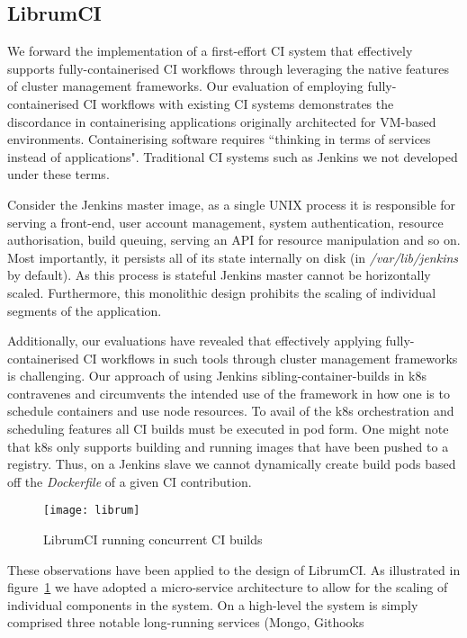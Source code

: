 \documentclass{report}
\begin{document}
\subsection{LibrumCI}
We forward the implementation of a first-effort CI system that
effectively supports fully-containerised CI workflows
through leveraging the native features of cluster 
management frameworks. Our evaluation of employing
fully-containerised CI workflows with existing CI systems
demonstrates the discordance in containerising applications originally architected for 
VM-based environments. Containerising software
requires ``thinking in terms of services instead
of applications". Traditional CI systems such as Jenkins
we not developed under these terms.
\par 
Consider the Jenkins master image, as a single UNIX process
it is responsible for serving a front-end, user account management,
system authentication, resource authorisation, build queuing, 
serving an API for resource manipulation
and so on. Most importantly, it persists all of its state internally on disk (in \textit{/var/lib/jenkins} by default).
As this process is stateful Jenkins master cannot be horizontally scaled. Furthermore,
this monolithic design prohibits the scaling of individual segments of the application. 
\par
Additionally, our evaluations have revealed that effectively
applying fully-containerised CI workflows in such tools through 
cluster management frameworks is challenging. Our approach
of using Jenkins sibling-container-builds in k8s contravenes 
and circumvents the intended use of the framework in how one is to 
schedule containers and use node resources. To avail of 
the k8s orchestration and scheduling features all
CI builds must be executed in pod form. One might note that
k8s only supports building and running images that have been pushed
to a registry. Thus, on a Jenkins slave we cannot dynamically create 
build pods based off the \textit{Dockerfile} of a given CI contribution.
\begin{figure}[htp]
      \centering
      \texttt{[image: librum]}
      \caption{LibrumCI running concurrent CI builds} 
      \label{fig:librum}
\end{figure}
\par
These observations have been applied to the design of LibrumCI. As illustrated in figure~\ref{fig:librum}
we have adopted a micro-service architecture to allow for the 
scaling of individual components in the system. On a high-level
the system is simply comprised three notable long-running services (Mongo, Githooks
\end{document}
